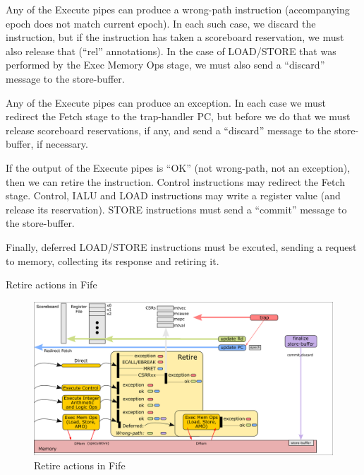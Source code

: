 Any of the Execute pipes can produce a wrong-path instruction
(accompanying epoch does not match current epoch).  In each such case,
we discard the instruction, but if the instruction has taken a
scoreboard reservation, we must also release that (``rel''
annotations).  In the case of LOAD/STORE that was performed by the
Exec Memory Ops stage, we must also send a ``discard'' message to the
store-buffer.

Any of the Execute pipes can produce an exception.  In each case we
must redirect the Fetch stage to the trap-handler PC, but before we do
that we must release scoreboard reservations, if any, and send a
``discard'' message to the store-buffer, if necessary.

If the output of the Execute pipes is ``OK'' (not wrong-path, not an
exception), then we can retire the instruction.  Control instructions
may redirect the Fetch stage.  Control, IALU and LOAD instructions may
write a register value (and release its reservation).  STORE
instructions must send a ``commit'' message to the store-buffer.

Finally, deferred LOAD/STORE instructions must be excuted, sending a
request to memory, collecting its response and retiring it.

Retire actions in Fife

\begin{figure}[htbp]
  \centerline{\includegraphics[width=6in,angle=0]{Figures/Fig_Retire_Layers_1_2}}
  \caption{\label{Fig_Retire_Fife}Retire actions in Fife}
\end{figure}

